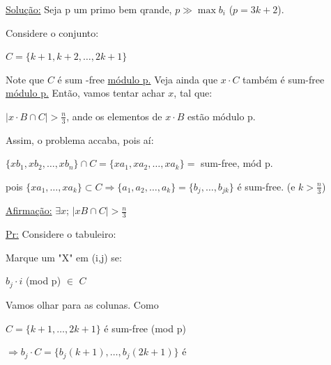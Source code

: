 \documentclass[a4paper,12pt]{article}
\theoremstyle{plain} %
\theoremstyle{definition} %
\theoremstyle{remark} %
\begin{document}
	\begin{framed}
		\underline{Solu\c{c}\~ao:} Seja p um primo bem qrande, $p\gg \max b_i$ ($p=3k+2$).
		
		Considere o conjunto:
		
		\begin{center}
			$C=\{k+1, k+2, \dotso, 2k+1\}$
		\end{center}
		
		Note que $C$ \'e sum -free \underline{m\'odulo p.} Veja ainda que $x\cdot C$ tamb\'em \'e sum-free \underline{m\'odulo p.} Ent\~ao, vamos tentar achar $x$, tal que:
		
		\begin{center}
			$|x\cdot B\cap C|>\frac{n}{3}$, ande os elementos de $x\cdot B$ est\~ao m\'odulo p.
		\end{center}
		
		Assim, o problema accaba, pois a\'i:
		
		$\{xb_1, xb_2, \dotso, xb_n\}\cap C=\{xa_1, xa_2, \dotso, xa_k\}=$ sum-free, m\'od p.
		
		pois $\{xa_1, \dotso, xa_k\}\subset C\Rightarrow\{a_1, a_2, \dotso, a_k\}=\{b_j, \dotso, b_{jk}\}$ \'e sum-free. (e $k>\frac{n}{3}$)
		
		\underline{Afirma\c{c}\~ao:} $\exists x$; $|xB\cap C|>\frac{n}{3}$
		
		\begin{multicols}{2}
			\underline{Pr:} Considere o tabuleiro:
			
			Marque um "X" em (i,j) se:
			
			$b_j\cdot i$ (mod p) \underline{$\in$} $C$ 
			
			Vamos olhar para as colunas. Como 
			
			$C=\{k+1, \dotso, 2k+1\}$ \'e sum-free (mod p)
			
			$\Rightarrow b_j\cdot C=\{b_j(k+1), \dotso, b_j(2k+1)\}$ \'e
			
			\columnbreak
			

\end{multicols}
\end{framed}
\end{document}
